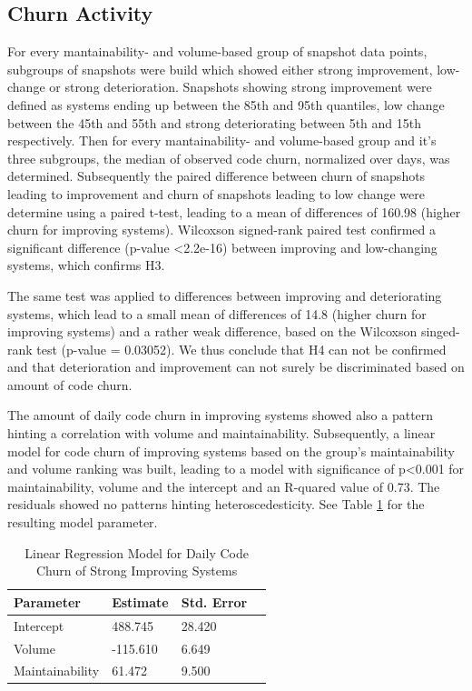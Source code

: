 \subsection{Churn Activity}
For every mantainability- and volume-based group of snapshot data points, subgroups of snapshots were build which showed either strong improvement, low-change or strong deterioration. Snapshots showing strong improvement were defined as systems ending up between the 85th and 95th quantiles, low change between the 45th and 55th and strong deteriorating between 5th and 15th respectively.
Then for every mantainability- and volume-based group and it's three subgroups, the median of observed code churn, normalized over days, was determined. Subsequently the paired difference between churn of snapshots leading to improvement and churn of snapshots leading to low change were determine using a paired t-test, leading to a mean of differences of 160.98 (higher churn for improving systems). Wilcoxson signed-rank paired test confirmed a significant difference (p-value \textless 2.2e-16) between improving and low-changing systems, which confirms H3. 

The same test was applied to differences between improving and deteriorating systems, which lead to a small mean of differences of 14.8 (higher churn for improving systems) and a rather weak difference, based on the Wilcoxson singed-rank test (p-value = 0.03052). We thus conclude that H4 can not be confirmed and that deterioration and improvement can not surely be discriminated based on amount of code churn.

The amount of daily code churn in improving systems showed also a pattern hinting a correlation with volume and maintainability. Subsequently, a linear model for code churn of improving systems based on the group's maintainability and volume ranking was built, leading to a model with significance of p\textless0.001 for maintainability, volume and the intercept and an R-quared value of 0.73. The residuals showed no patterns hinting heteroscedesticity. See Table \ref{results_churn} for the resulting model parameter.
\begin{table}[htbp!]
\centering
\caption{Linear Regression Model for Daily Code Churn of Strong Improving Systems}
\begin{tabular}{l  l  l p{1.2cm}}
  \hline			
  Parameter & Estimate & Std. Error\\ \hline
  Intercept & 488.745 & 28.420\\ 
  Volume & -115.610 & 6.649\\ 
  Maintainability & 61.472 & 9.500\\ 
\end{tabular}
\label{results_churn}
\end{table}


